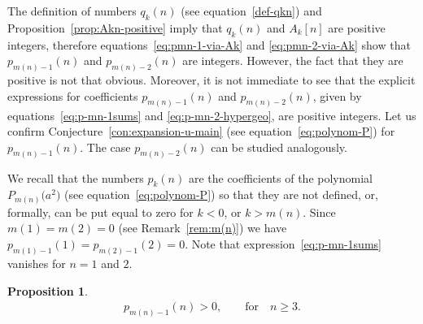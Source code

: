\documentclass[pdftex]{sigma}
\numberwithin{equation}{section}
\newtheorem{Proposition}[Theorem]{Proposition}
 { \theoremstyle{definition}
\newtheorem{Remark}[Theorem]{Remark} }
\begin{document}
\begin{Remark}
The definition of numbers $q_k(n)$ (see equation~\eqref{def-qkn}) and Proposition~\ref{prop:Akn-positive} imply that
$q_k(n)$ and $A_k[n]$ are positive integers, therefore equations~\eqref{eq:pmn-1-via-Ak} and \eqref{eq:pmn-2-via-Ak}
show that $p_{m(n)-1}(n)$ and $p_{m(n)-2}(n)$ are integers. However, the fact that they are positive is not that obvious.
Moreover, it is not immediate to see that the explicit expressions for coefficients $p_{m(n)-1}(n)$ and $p_{m(n)-2}(n)$,
given by equations~\eqref{eq:p-mn-1sums} and \eqref{eq:p-mn-2-hypergeo}, are positive integers. Let us confirm
Conjecture~\ref{con:expansion-u-main} (see equation~\eqref{eq:polynom-P}) for $p_{m(n)-1}(n)$. The case $p_{m(n)-2}(n)$
can be studied analogously.

We recall that the numbers $p_k(n)$ are the coefficients of the polynomial $P_{m(n)}\big(a^2\big)$ (see equation~\eqref{eq:polynom-P})
so that they are not defined, or, formally, can be put equal to zero for $k<0$, or $k>m(n)$.
Since $m(1)=m(2)=0$ (see Remark~\ref{rem:m(n)}) we have $p_{m(1)-1}(1)=p_{m(2)-1}(2)=0$. Note that
expression~\eqref{eq:p-mn-1sums} vanishes for $n=1$ and $2$.
\end{Remark}
\begin{Proposition}\label{prop:pmn-1>0}
\begin{gather*}
p_{m(n)-1}(n)>0,\qquad\textrm{for}\quad n\geq3.
\end{gather*}
\end{Proposition}
\end{document}
